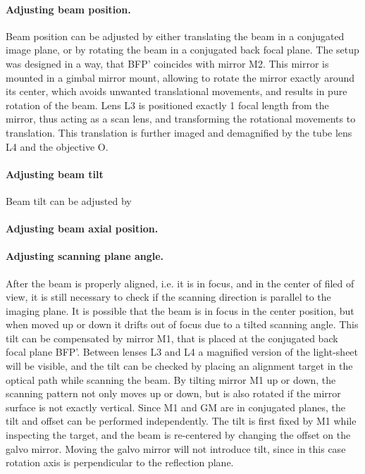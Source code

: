 \paragraph{Adjusting beam position.}
Beam position can be adjusted by either translating the beam in a conjugated image plane, or by rotating the beam in a conjugated back focal plane. The setup was designed in a way, that BFP' coincides with mirror M2. This mirror is mounted in a gimbal mirror mount, allowing to rotate the mirror exactly around its center, which avoids unwanted translational movements, and results in pure rotation of the beam. Lens L3 is positioned exactly 1 focal length from the mirror, thus acting as a scan lens, and transforming the rotational movements to translation. This translation is further imaged and demagnified by the tube lens L4 and the objective O.


\paragraph{Adjusting beam tilt}
Beam tilt can be adjusted by 



\paragraph{Adjusting beam axial position.}


\paragraph{Adjusting scanning plane angle.}
After the beam is properly aligned, i.e. it is in focus, and in the center of filed of view, it is still necessary to check if the scanning direction is parallel to the imaging plane. It is possible that the beam is in focus in the center position, but when moved up or down it drifts out of focus due to a tilted scanning angle. This tilt can be compensated by mirror M1, that is placed at the conjugated back focal plane BFP'. Between lenses L3 and L4 a magnified version of the light-sheet will be visible, and the tilt can be checked by placing an alignment target in the optical path while scanning the beam. By tilting mirror M1 up or down, the scanning pattern not only moves up or down, but is also rotated if the mirror surface is not exactly vertical. Since M1 and GM are in conjugated planes, the tilt and offset can be performed independently. The tilt is first fixed by M1 while inspecting the target, and the beam is re-centered by changing the offset on the galvo mirror. Moving the galvo mirror will not introduce tilt, since in this case rotation axis is perpendicular to the reflection plane.





